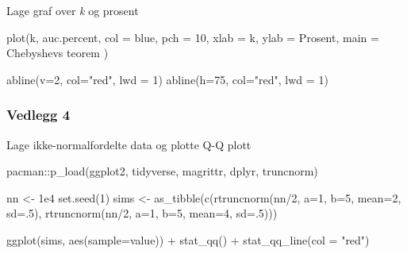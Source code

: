 \documentclass[
]{book}
\newenvironment{Shaded}{\begin{snugshade}}{\end{snugshade}}
\newcommand{\AttributeTok}[1]{\textcolor[rgb]{0.77,0.63,0.00}{#1}}
\newcommand{\DecValTok}[1]{\textcolor[rgb]{0.00,0.00,0.81}{#1}}
\newcommand{\FloatTok}[1]{\textcolor[rgb]{0.00,0.00,0.81}{#1}}
\newcommand{\FunctionTok}[1]{\textcolor[rgb]{0.00,0.00,0.00}{#1}}
\newcommand{\NormalTok}[1]{#1}
\newcommand{\OtherTok}[1]{\textcolor[rgb]{0.56,0.35,0.01}{#1}}
\newcommand{\SpecialCharTok}[1]{\textcolor[rgb]{0.00,0.00,0.00}{#1}}
\newcommand{\StringTok}[1]{\textcolor[rgb]{0.31,0.60,0.02}{#1}}
\begin{document}
Lage graf over \emph{k} og prosent

\begin{Shaded}
\begin{Highlighting}[]
\FunctionTok{plot}\NormalTok{(k, }
\NormalTok{     auc.percent, }
     \AttributeTok{col =} \StringTok{\textquotesingle{}blue\textquotesingle{}}\NormalTok{, }
     \AttributeTok{pch =} \DecValTok{10}\NormalTok{, }
     \AttributeTok{xlab =} \StringTok{\textquotesingle{}k\textquotesingle{}}\NormalTok{, }
     \AttributeTok{ylab =} \StringTok{\textquotesingle{}Prosent\textquotesingle{}}\NormalTok{, }
     \AttributeTok{main =} \StringTok{\textquotesingle{}Chebyshevs teorem\textquotesingle{}}\NormalTok{ )}

\FunctionTok{abline}\NormalTok{(}\AttributeTok{v=}\DecValTok{2}\NormalTok{, }\AttributeTok{col=}\StringTok{"red"}\NormalTok{, }\AttributeTok{lwd =} \DecValTok{1}\NormalTok{)}
\FunctionTok{abline}\NormalTok{(}\AttributeTok{h=}\DecValTok{75}\NormalTok{, }\AttributeTok{col=}\StringTok{"red"}\NormalTok{, }\AttributeTok{lwd =} \DecValTok{1}\NormalTok{)}
\end{Highlighting}
\end{Shaded}

\hypertarget{vedlegg-4}{%
\subsubsection*{Vedlegg 4}\label{vedlegg-4}}

Lage ikke-normalfordelte data og plotte Q-Q plott

\begin{Shaded}
\begin{Highlighting}[]
\NormalTok{pacman}\SpecialCharTok{::}\FunctionTok{p\_load}\NormalTok{(ggplot2, tidyverse, magrittr, dplyr, truncnorm)}

\NormalTok{nn }\OtherTok{\textless{}{-}} \FloatTok{1e4}
\FunctionTok{set.seed}\NormalTok{(}\DecValTok{1}\NormalTok{)}
\NormalTok{sims }\OtherTok{\textless{}{-}} \FunctionTok{as\_tibble}\NormalTok{(}\FunctionTok{c}\NormalTok{(}\FunctionTok{rtruncnorm}\NormalTok{(nn}\SpecialCharTok{/}\DecValTok{2}\NormalTok{, }\AttributeTok{a=}\DecValTok{1}\NormalTok{, }\AttributeTok{b=}\DecValTok{5}\NormalTok{, }\AttributeTok{mean=}\DecValTok{2}\NormalTok{, }\AttributeTok{sd=}\NormalTok{.}\DecValTok{5}\NormalTok{),}
                    \FunctionTok{rtruncnorm}\NormalTok{(nn}\SpecialCharTok{/}\DecValTok{2}\NormalTok{, }\AttributeTok{a=}\DecValTok{1}\NormalTok{, }\AttributeTok{b=}\DecValTok{5}\NormalTok{, }\AttributeTok{mean=}\DecValTok{4}\NormalTok{, }\AttributeTok{sd=}\NormalTok{.}\DecValTok{5}\NormalTok{)))}

\FunctionTok{ggplot}\NormalTok{(sims, }\FunctionTok{aes}\NormalTok{(}\AttributeTok{sample=}\NormalTok{value)) }\SpecialCharTok{+} \FunctionTok{stat\_qq}\NormalTok{() }\SpecialCharTok{+} \FunctionTok{stat\_qq\_line}\NormalTok{(}\AttributeTok{col =} \StringTok{"red"}\NormalTok{)}
\end{Highlighting}
\end{Shaded}
\end{document}
